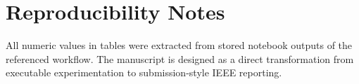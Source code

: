 \documentclass[10pt,journal]{IEEEtran}
\begin{document}
\section*{Reproducibility Notes}
All numeric values in tables were extracted from stored notebook outputs of the referenced workflow. The manuscript is designed as a direct transformation from executable experimentation to submission-style IEEE reporting.



\end{document}
